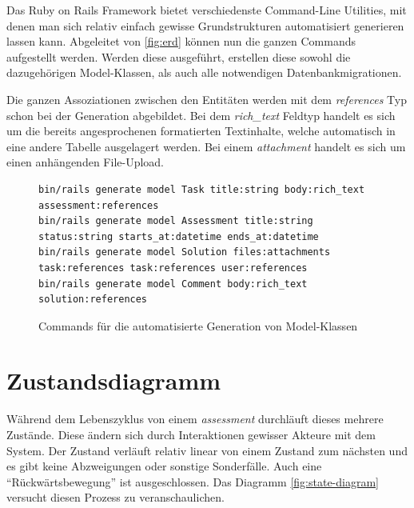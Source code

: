 Das Ruby on Rails Framework bietet verschiedenste Command-Line Utilities, mit denen man sich relativ einfach gewisse
Grundstrukturen automatisiert generieren lassen kann. Abgeleitet von \ref{fig:erd} können nun die ganzen Commands aufgestellt werden.
Werden diese ausgeführt, erstellen diese sowohl die dazugehörigen Model-Klassen, als auch alle notwendigen Datenbankmigrationen.

Die ganzen Assoziationen zwischen den Entitäten werden mit dem \emph{references} Typ schon bei der Generation abgebildet.
Bei dem \emph{rich\_text} Feldtyp handelt es sich um die bereits angesprochenen formatierten Textinhalte,
welche automatisch in eine andere Tabelle ausgelagert werden. Bei einem \emph{attachment} handelt es sich um einen anhängenden File-Upload.

\begin{figure}[H]
    \begin{codebox}[]
        \begin{verbatim}
bin/rails generate model Task title:string body:rich_text assessment:references
bin/rails generate model Assessment title:string status:string starts_at:datetime ends_at:datetime
bin/rails generate model Solution files:attachments task:references task:references user:references
bin/rails generate model Comment body:rich_text solution:references 
\end{verbatim}
    \end{codebox}
    \caption{\label{fig:generate-models}Commands für die automatisierte Generation von Model-Klassen}
\end{figure}

\newpage

\section{Zustandsdiagramm}

Während dem Lebenszyklus von einem \emph{assessment} durchläuft dieses mehrere Zustände. Diese ändern
sich durch Interaktionen gewisser Akteure mit dem System. Der Zustand verläuft relativ linear von einem Zustand zum nächsten und es gibt keine Abzweigungen
oder sonstige Sonderfälle. Auch eine \enquote{Rückwärtsbewegung} ist ausgeschlossen. Das Diagramm \ref{fig:state-diagram} versucht diesen Prozess zu veranschaulichen.

